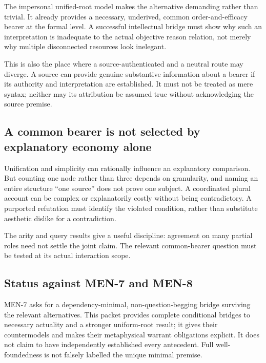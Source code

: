\documentclass[11pt,a4paper]{article}
\begin{document}
The impersonal unified-root model makes the alternative demanding rather
than trivial. It already provides a necessary, underived, common
order-and-efficacy bearer at the formal level. A successful intellectual
bridge must show why such an interpretation is inadequate to the actual
objective reason relation, not merely why multiple disconnected
resources look inelegant.

This is also the place where a source-authenticated and a neutral route
may diverge. A source can provide genuine substantive information about
a bearer if its authority and interpretation are established. It must
not be treated as mere syntax; neither may its attribution be assumed
true without acknowledging the source premise.

\subsection{A common bearer is not selected by explanatory economy
alone}\label{a-common-bearer-is-not-selected-by-explanatory-economy-alone}

Unification and simplicity can rationally influence an explanatory
comparison. But counting one node rather than three depends on
granularity, and naming an entire structure ``one source'' does not
prove one subject. A coordinated plural account can be complex or
explanatorily costly without being contradictory. A purported refutation
must identify the violated condition, rather than substitute aesthetic
dislike for a contradiction.

The arity and query results give a useful discipline: agreement on many
partial roles need not settle the joint claim. The relevant
common-bearer question must be tested at its actual interaction scope.

\subsection{Status against MEN-7 and
MEN-8}\label{status-against-men-7-and-men-8}

MEN-7 asks for a dependency-minimal, non-question-begging bridge
surviving the relevant alternatives. This packet provides complete
conditional bridges to necessary actuality and a stronger uniform-root
result; it gives their countermodels and makes their metaphysical
warrant obligations explicit. It does not claim to have independently
established every antecedent. Full well-foundedness is not falsely
labelled the unique minimal premise.
\end{document}
